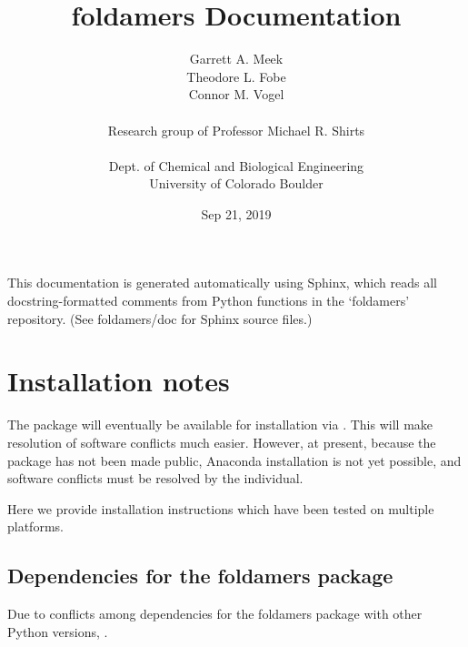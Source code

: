\documentclass[letterpaper,12pt,english,openany,oneside]{sphinxmanual}
\title{foldamers Documentation}
\date{Sep 21, 2019}
\author{Garrett A. Meek\\Theodore L. Fobe\\Connor M. Vogel\\ \\Research group of Professor Michael R. Shirts\\ \\Dept. of Chemical and Biological Engineering\\University of Colorado Boulder}
\begin{document}
\pagestyle{empty}
\sphinxmaketitle
\pagestyle{plain}
\sphinxtableofcontents
\pagestyle{normal}
\label{\detokenize{index::doc}}


This documentation is generated automatically using Sphinx, which reads all docstring-formatted comments from Python functions in the ‘foldamers’ repository.  (See foldamers/doc for Sphinx source files.)


\chapter{Installation notes}
\label{\detokenize{install:installation-notes}}\label{\detokenize{install::doc}}
The  package will eventually be available for installation via .  This will make resolution of software conflicts much easier.  However, at present, because the package has not been made public, Anaconda installation is not yet possible, and software conflicts must be resolved by the individual.

Here we provide installation instructions which have been tested on multiple platforms.


\section{Dependencies for the foldamers package}
\label{\detokenize{install:dependencies-for-the-foldamers-package}}
Due to conflicts among dependencies for the foldamers package with other Python versions, .
\end{document}
